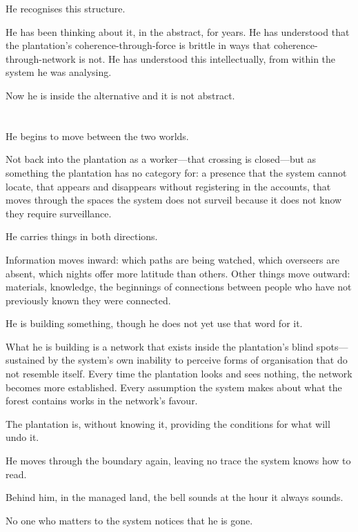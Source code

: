 He recognises this structure.

He has been thinking about it, in the abstract, for years. He
has understood that the plantation's coherence-through-force
is brittle in ways that coherence-through-network is not. He
has understood this intellectually, from within the system he
was analysing.

Now he is inside the alternative and it is not abstract.

\section{}

He begins to move between the two worlds.

Not back into the plantation as a worker---that crossing is
closed---but as something the plantation has no category for:
a presence that the system cannot locate, that appears and
disappears without registering in the accounts, that moves
through the spaces the system does not surveil because it does
not know they require surveillance.

He carries things in both directions.

Information moves inward: which paths are being watched, which
overseers are absent, which nights offer more latitude than
others. Other things move outward: materials, knowledge, the
beginnings of connections between people who have not previously
known they were connected.

He is building something, though he does not yet use that word
for it.

What he is building is a network that exists inside the
plantation's blind spots---sustained by the system's own
inability to perceive forms of organisation that do not
resemble itself. Every time the plantation looks and sees
nothing, the network becomes more established. Every assumption
the system makes about what the forest contains works in the
network's favour.

The plantation is, without knowing it, providing the conditions
for what will undo it.

He moves through the boundary again, leaving no trace the
system knows how to read.

Behind him, in the managed land, the bell sounds at the hour
it always sounds.

No one who matters to the system notices that he is gone.

